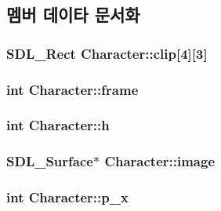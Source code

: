 \subsection{멤버 데이타 문서화}
\hypertarget{class_character_a597a53af58019f1654e70714bacab249}{
\subsubsection[{clip}]{\setlength{\rightskip}{0pt plus 5cm}\-S\-D\-L\-\_\-\-Rect {\bf \-Character\-::clip}\mbox{[}4\mbox{]}\mbox{[}3\mbox{]}}}\label{class_character_a597a53af58019f1654e70714bacab249}
\hypertarget{class_character_a78ea8d15292e89650d12d98878bac42c}{
\subsubsection[{frame}]{\setlength{\rightskip}{0pt plus 5cm}int {\bf \-Character\-::frame}}}\label{class_character_a78ea8d15292e89650d12d98878bac42c}
\hypertarget{class_character_a5a455718929221529a9c01781579927b}{
\subsubsection[{h}]{\setlength{\rightskip}{0pt plus 5cm}int {\bf \-Character\-::h}}}\label{class_character_a5a455718929221529a9c01781579927b}
\hypertarget{class_character_a1769b630de33a3da0dd7456e71350a84}{
\subsubsection[{image}]{\setlength{\rightskip}{0pt plus 5cm}\-S\-D\-L\-\_\-\-Surface$\ast$ {\bf \-Character\-::image}}}\label{class_character_a1769b630de33a3da0dd7456e71350a84}
\hypertarget{class_character_ac3c6fdfe5ccb5e984c83e20c28e7e4f2}{
\subsubsection[{p\-\_\-x}]{\setlength{\rightskip}{0pt plus 5cm}int {\bf \-Character\-::p\-\_\-x}}}\label{class_character_ac3c6fdfe5ccb5e984c83e20c28e7e4f2}
